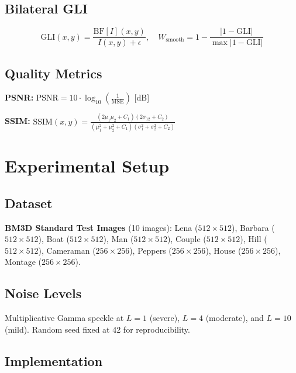 \documentclass[12pt,a4paper]{article}
\begin{document}
\subsection{Bilateral GLI}

\begin{equation}
\text{GLI}(x,y) = \frac{\text{BF}[I](x,y)}{I(x,y) + \epsilon}, \quad W_{\text{smooth}} = 1 - \frac{|1 - \text{GLI}|}{\max|1 - \text{GLI}|}
\end{equation}

\subsection{Quality Metrics}

\textbf{PSNR:}
$\text{PSNR} = 10 \cdot \log_{10}\left(\frac{1}{\text{MSE}}\right)$ [dB]

\textbf{SSIM:}
$\text{SSIM}(x,y) = \frac{(2\mu_1\mu_2 + C_1)(2\sigma_{12} + C_2)}{(\mu_1^2 + \mu_2^2 + C_1)(\sigma_1^2 + \sigma_2^2 + C_2)}$

\section{Experimental Setup}

\subsection{Dataset}

\textbf{BM3D Standard Test Images} (10 images): Lena ($512 \times 512$), Barbara ($512 \times 512$), Boat ($512 \times 512$), Man ($512 \times 512$), Couple ($512 \times 512$), Hill ($512 \times 512$), Cameraman ($256 \times 256$), Peppers ($256 \times 256$), House ($256 \times 256$), Montage ($256 \times 256$).

\subsection{Noise Levels}

Multiplicative Gamma speckle at $L = 1$ (severe), $L = 4$ (moderate), and $L = 10$ (mild). Random seed fixed at 42 for reproducibility.

\subsection{Implementation}
\end{document}
